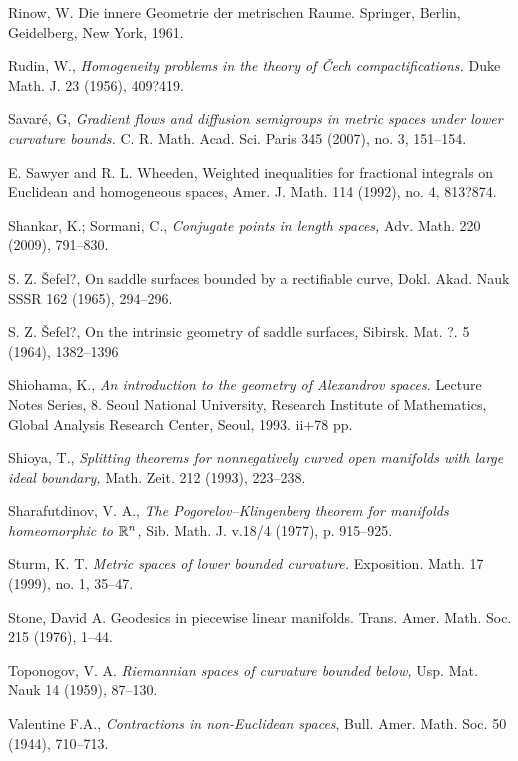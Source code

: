 \begin{thebibliography}{52}
Rinow, W. Die innere Geometrie der metrischen Raume. Springer, Berlin, Geidelberg, New York, 1961.

Rudin, W.,
\textit{Homogeneity problems in the theory of \v{C}ech compactifications.}
Duke Math. J. 23 (1956), 409?419. 

Savar\'e, G, \textit{Gradient flows and diffusion semigroups in metric spaces under lower curvature bounds.}  C. R. Math. Acad. Sci. Paris  345  (2007),  no. 3, 151--154. 

 E. Sawyer and R. L. Wheeden, Weighted inequalities for fractional integrals on Euclidean and homogeneous spaces, Amer. J. Math. 114 (1992), no. 4, 813?874.

Shankar, K.; Sormani, C., \textit{Conjugate points in length spaces,} 
Adv. Math. 220 (2009), 791--830.

 S. Z. \v{S}efel?, On saddle surfaces bounded by a rectifiable curve, Dokl. Akad. Nauk SSSR 162 (1965), 294--296.

 S. Z. \v{S}efel?, On the intrinsic geometry of saddle surfaces, Sibirsk. Mat. ?. 5 (1964), 1382--1396

 Shiohama, K., \textit{An introduction to the geometry of
Alexandrov spaces.} Lecture Notes Series, 8. Seoul National University, Research
Institute of Mathematics, Global Analysis Research Center, Seoul, 1993. ii+78
pp.

  Shioya, T., \textit{Splitting theorems for nonnegatively curved open manifolds with large ideal boundary,} Math. Zeit. 212 (1993), 223--238.

Sharafutdinov, V. A., 
\textit{The Pogorelov--Klingenberg theorem for manifolds homeomorphic to $\mathbb{R}^n$,} 
Sib. Math. J. v.18/4 (1977), p. 915--925.

Sturm, K. T. \textit{Metric spaces of lower bounded curvature.}  
Exposition. Math.  17  (1999),  no. 1, 35--47.

Stone, David A.
Geodesics in piecewise linear manifolds.
Trans. Amer. Math. Soc. 215 (1976), 1--44. 

  Toponogov, V. A. \textit{Riemannian spaces of curvature bounded below,} Usp. Mat. Nauk 14 (1959), 87--130.

 Valentine F.A., 
\textit{Contractions in non-Euclidean spaces}, Bull. Amer. Math. Soc. 50 (1944), 710--713.


\end{thebibliography}
